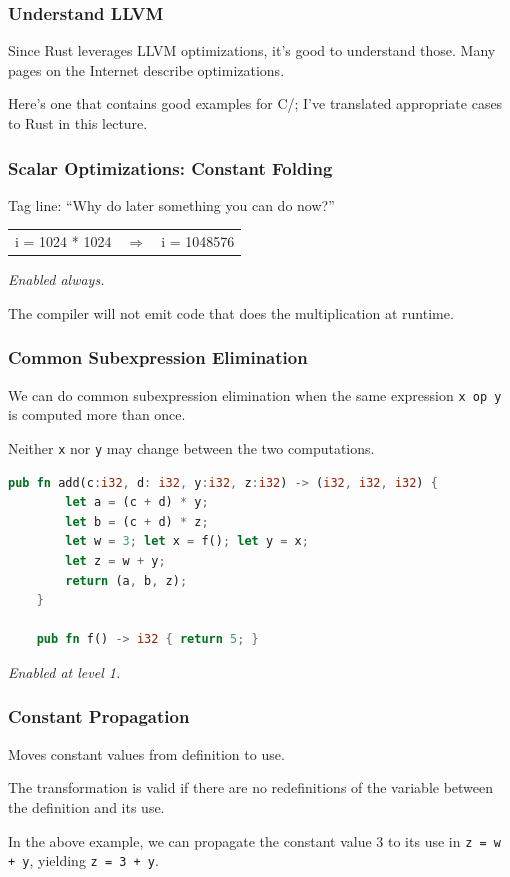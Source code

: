 \begin{frame}
\frametitle{Understand LLVM}
 Since Rust leverages LLVM optimizations, it's good to understand those. Many pages on the Internet describe
optimizations. 

Here's one that contains good examples for C/\CPP; I've translated appropriate cases to Rust in this lecture.

\end{frame}


\begin{frame}
\frametitle{Scalar Optimizations: Constant Folding}

Tag line: ``Why do later something you can do now?''

\begin{center}
\vspace*{-1em}
\begin{tabular}{lll}
i = 1024 * 1024 &
$\Longrightarrow$ &
i = 1048576
\end{tabular}
\end{center}

\emph{Enabled always.}

The compiler will not emit code that does the multiplication at runtime.

\end{frame}


\begin{frame}[fragile]
\frametitle{Common Subexpression Elimination}

We can do common subexpression elimination
when the same expression {\tt x~op~y} is computed more than once. 

Neither {\tt x} nor {\tt y} may change between the two computations. 


\begin{lstlisting}[language=Rust]
    pub fn add(c:i32, d: i32, y:i32, z:i32) -> (i32, i32, i32) {
        let a = (c + d) * y;
        let b = (c + d) * z;
        let w = 3; let x = f(); let y = x;
        let z = w + y;
        return (a, b, z);
    }

    pub fn f() -> i32 { return 5; }
\end{lstlisting}

\noindent \emph{Enabled at level 1.}

\end{frame}

\begin{frame}
\frametitle{Constant Propagation}

Moves constant values from definition to
use. 

The transformation is valid if there are no redefinitions of the
variable between the definition and its use.

 In the above example,
we can propagate the constant value 3 to its use in {\tt z = w + y},
yielding {\tt z = 3 + y}.



\end{frame}

